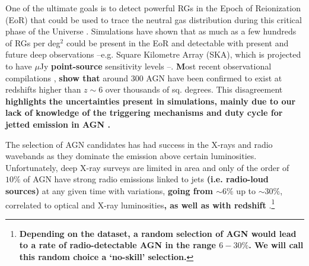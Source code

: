 \documentclass{aa}
\begin{document}
One of the ultimate goals is to detect powerful RGs in the Epoch of Reionization (EoR) that could be used to trace the neutral gas distribution during this critical phase of the Universe \citep[e.g.][]{2004NewAR..48.1029C, 2013MNRAS.435..460J}. Simulations  have shown that as much as a few hundreds of RGs per deg$^2$ could be present in the EoR \citep[][]{2019MNRAS.485.2694A, 2019MNRAS.482....2B, 2021MNRAS.503.3492T} and detectable with present and future deep observations --e.g. Square Kilometre Array (SKA), which is projected to have $\mu$Jy \textbf{point-source} sensitivity levels \textbf{\citep[SKA1-Mid is expected to reach close to $2 \, \mu$Jy in $1$-hour continuum observations at $\nu\,{\gtrsim} 1$ GHz;][]{2015aska.confE..67P, 2019arXiv191212699B}}--. \textbf{M}ost recent observational compilations \citep[e.g.][]{2020ARA&A..58...27I, 2020MNRAS.494..789R, sarah_e_i_bosman_2022_6039724, 2022arXiv221206907F}, \textbf{show that} around $300$ AGN have been confirmed to exist at redshifts higher than $z{\sim}6$ over thousands of sq. degrees. This disagreement \textbf{highlights the uncertainties present in simulations, mainly due to our lack of knowledge of the triggering mechanisms and duty cycle for jetted emission in AGN \citep{2015aska.confE..71A, 2022MNRAS.510.1163P}.}

The selection of AGN candidates has had success in the X-rays and radio wavebands as they dominate the emission above certain luminosities. Unfortunately, deep X-ray surveys are limited in area and only of the order of $10\%$ of AGN have strong radio emissions linked to jets \textbf{(i.e. radio-loud sources)} at any given time with variations, \textbf{going from $\sim 6\%$} up to \textbf{$\sim 30\%$}, correlated to optical and X-ray luminosities\textbf{, as well as with redshift} \citep[e.g.][]{1993MNRAS.263..461P, 1994ApJ...430..533D, 2007ApJ...656..680J, 2019NatAs...3...48S, 2019A&A...622A..11G, 2021MNRAS.506.5888M, 2021A&A...656A.137G, 2022A&A...668A..27G, 2023MNRAS.tmp.1261B}.\footnote{\textbf{Depending on the dataset, a random selection of AGN would lead to a rate of radio-detectable AGN in the range $6 - 30 \%$. We will call this random choice a `no-skill' selection.}}

\end{document}
